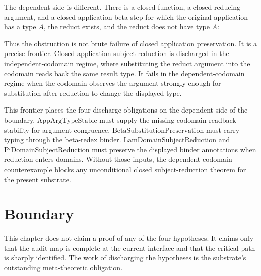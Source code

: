 The dependent side is different. There is a closed function, a closed reducing argument, and a closed application beta step for which the original application has a type $A$, the reduct exists, and the reduct does not have type $A$:

Thus the obstruction is not brute failure of closed application preservation. It is a precise frontier. Closed application subject reduction is discharged in the independent-codomain regime, where substituting the reduct argument into the codomain reads back the same result type. It fails in the dependent-codomain regime when the codomain observes the argument strongly enough for substitution after reduction to change the displayed type.

This frontier places the four discharge obligations on the dependent side of the boundary. $\mathrm{AppArgTypeStable}$ must supply the missing codomain-readback stability for argument congruence. $\mathrm{BetaSubstitutionPreservation}$ must carry typing through the beta-redex binder. $\mathrm{LamDomainSubjectReduction}$ and $\mathrm{PiDomainSubjectReduction}$ must preserve the displayed binder annotations when reduction enters domains. Without those inputs, the dependent-codomain counterexample blocks any unconditional closed subject-reduction theorem for the present substrate.

\section{Boundary}
\label{sec:metacic-subject-reduction-boundary}

This chapter does not claim a proof of any of the four hypotheses. It claims only that the audit map is complete at the current interface and that the critical path is sharply identified. The work of discharging the hypotheses is the substrate's outstanding meta-theoretic obligation.

